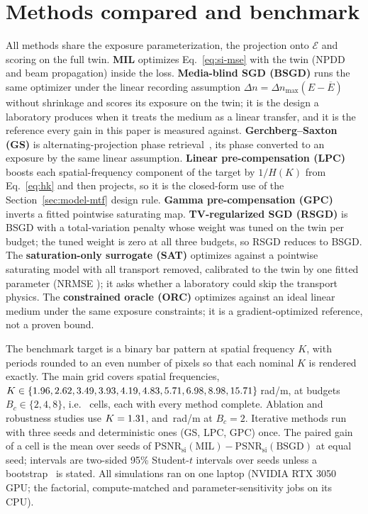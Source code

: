 \documentclass{optica-article}
\begin{document}
\section{Methods compared and benchmark}
\label{sec:method}
All methods share the exposure parameterization, the projection onto
$\mathcal{E}$ and scoring on the full twin. \textbf{MIL} optimizes
Eq.~\eqref{eq:si-mse} with the twin (NPDD and beam propagation) inside the
loss. \textbf{Media-blind SGD (BSGD)} runs the same optimizer under the linear
recording assumption $\Delta n=\Delta n_{\max}(E-\overline{E})$ without
shrinkage and scores its exposure on the twin; it is the design a laboratory
produces when it treats the medium as a linear transfer, and it is the
reference every gain in this paper is measured against.
\textbf{Gerchberg--Saxton (GS)} is alternating-projection phase
retrieval~\cite{gerchberg1972practical,fienup1982phase}, its phase converted to
an exposure by the same linear assumption. \textbf{Linear pre-compensation
(LPC)} boosts each spatial-frequency component of the target by $1/H(K)$ from
Eq.~\eqref{eq:hk} and then projects, so it is the closed-form use of the
Section~\ref{sec:model-mtf} design rule. \textbf{Gamma pre-compensation (GPC)}
inverts a fitted pointwise saturating map. \textbf{TV-regularized SGD (RSGD)}
is BSGD with a total-variation penalty whose weight was tuned on the twin per
budget; the tuned weight is zero at all three budgets, so RSGD reduces to BSGD.
The \textbf{saturation-only surrogate (SAT)} optimizes against a pointwise
saturating model with all transport removed, calibrated to the twin by one
fitted parameter (NRMSE \SATFitNRMSE); it asks whether a laboratory could skip
the transport physics. The \textbf{constrained oracle (ORC)} optimizes against
an ideal linear medium under the same exposure constraints; it is a
gradient-optimized reference, not a proven bound.

The benchmark target is a binary bar pattern at spatial frequency $K$, with
periods rounded to an even number of pixels so that each nominal $K$ is
rendered exactly. The main grid covers \MOneNK{} spatial frequencies,
$K\in\{1.96, 2.62, 3.49, 3.93, 4.19, 4.83, 5.71, 6.98, 8.98, 15.71\}$\,rad/\textmu m, at budgets $B_c\in\{2,4,8\}$, i.e.\
\MOneNCells{} cells, each with every method complete. Ablation and robustness
studies use $K=1.31$, \SOneKNear{} and \SOneKPost\,rad/\textmu m at
$B_c=2$. Iterative methods run with three seeds and deterministic ones (GS,
LPC, GPC) once. The paired gain of a cell is the mean over seeds of
$\mathrm{PSNR}_{\text{si}}(\text{MIL})-\mathrm{PSNR}_{\text{si}}(\text{BSGD})$
at equal seed; intervals are two-sided 95\% Student-$t$ intervals over seeds
unless a bootstrap~\cite{efron1993bootstrap} is stated. All simulations ran on
one laptop (NVIDIA RTX 3050 GPU; the factorial, compute-matched and
parameter-sensitivity jobs on its CPU).
\end{document}
